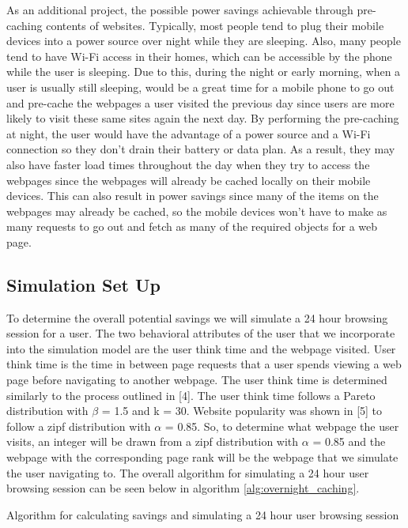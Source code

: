 As an additional project, the possible power savings achievable through pre-caching contents of websites. Typically, most people tend to plug their mobile devices into a power source over night while they are sleeping. Also, many people tend to have Wi-Fi access in their homes, which can be accessible by the phone while the user is sleeping. Due to this, during the night or early morning, when a user is usually still sleeping, would be a great time for a mobile phone to go out and pre-cache the webpages a user visited the previous day since users are more likely to visit these same sites again the next day. By performing the pre-caching at night, the user would have the advantage of a power source and a Wi-Fi connection so they don’t drain their battery or data plan. As a result, they may also have faster load times throughout the day when they try to access the webpages since the webpages will already be cached locally on their mobile devices. This can also result in power savings since many of the items on the webpages may already be cached, so the mobile devices won’t have to make as many requests to go out and fetch as many of the required objects for a web page.

\subsection*{Simulation Set Up}
To determine the overall potential savings we will simulate a 24 hour browsing session for a user. The two behavioral attributes of the user that we incorporate into the simulation model are the user think time and the webpage visited. User think time is the time in between page requests that a user spends viewing a web page before navigating to another webpage. The user think time is determined similarly to the process outlined in [4]. The user think time follows a Pareto distribution with $\beta$ = 1.5 and k = 30. Website popularity was shown in [5] to follow a zipf distribution with $\alpha$ = 0.85. So, to determine what webpage the user visits, an integer will be drawn from a zipf distribution with $\alpha$ = 0.85 and the webpage with the corresponding page rank will be the webpage that we simulate the user navigating to. The overall algorithm for simulating a 24 hour user browsing session can be seen below in algorithm \ref{alg:overnight_caching}.

\begin{algorithm}[H]
\label{alg:overnight_caching}
 \caption{Algorithm for calculating savings and simulating a 24 hour user browsing session}
\end{algorithm}

